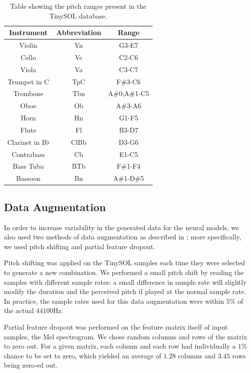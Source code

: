 \documentclass[runningheads,a4paper]{llncs}
\begin{document}
 
\begin{table}
\begin{center}
	\caption{Table showing the pitch ranges present in the TinySOL database.\label{tab:ranges}}
	\begin{tabular}{|c|c|c|}
	\hline
	\textbf{Instrument} & \textbf{Abbreviation} & \textbf{Range} \\
	\hline
	Violin & Vn & G3-E7\\
	Cello & Vc & C2-C6\\
	Viola & Va & C3-C7\\
	Trumpet in C & TpC & F\#3-C6\\
	Trombone & Tbn & A\#0;A\#1-C5\\
	Oboe & Ob & A\#3-A6\\
	Horn & Hn & G1-F5\\
	Flute & Fl & B3-D7\\
	Clarinet in B$\flat$ & ClBb & D3-G6\\
	Contrabass & Cb & E1-C5\\
	Bass Tuba & BTb & F\#1-F4\\
	Bassoon & Bn & A\#1-D\#5\\
	\hline
	\end{tabular}
\end{center}
\end{table}

\subsection{Data Augmentation}

In order to increase variability in the generated data for the neural models, we also used two methods of data augmentation as described in \cite{Salamon17, Bhardwaj17}; more specifically, we used pitch shifting and partial feature dropout.

Pitch shifting was applied on the TinySOL samples each time they were selected to generate a new combination. We performed a small pitch shift by reading the samples with different sample rates: a small difference in sample rate will slightly modify the duration and the perceived pitch if played at the normal sample rate. In practice, the sample rates used for this data augmentation were within $5\%$ of the actual $44100$Hz.

Partial feature dropout was performed on the feature matrix itself of input samples, the Mel spectrogram. We chose random columns and rows of the matrix to zero out. For a given matrix, each column and each row had individually a $1\%$ chance to be set to zero, which yielded an average of $1.28$  columns and $3.45$ rows being zero-ed out.
\end{document}
